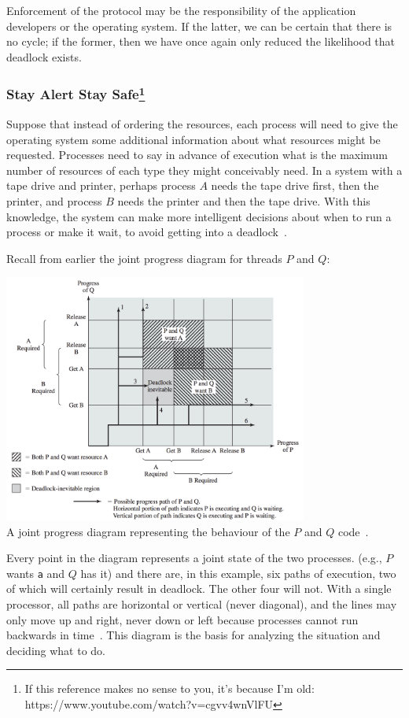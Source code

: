 Enforcement of the protocol may be the responsibility of the application developers or the operating system. If the latter, we can be certain that there is no cycle; if the former, then we have once again only reduced the likelihood that deadlock exists. 

\subsubsection*{Stay Alert Stay Safe\footnote{If this reference makes no sense to you, it's because I'm old: https://www.youtube.com/watch?v=cgvv4wnVlFU}}

Suppose that instead of ordering the resources, each process will need to give the operating system some additional information about what resources might be requested. Processes need to say in advance of execution what is the maximum number of resources of each type they might conceivably need. In a system with a tape drive and printer, perhaps process $A$ needs the tape drive first, then the printer, and process $B$ needs the printer and then the tape drive. With this knowledge, the system can make more intelligent decisions about when to run a process or make it wait, to avoid getting into a deadlock~\cite{osc}.

Recall from earlier the joint progress diagram for threads $P$ and $Q$:

\begin{center}
\includegraphics[width=0.75\textwidth]{images/joint-progress}\\
A joint progress diagram representing the behaviour of the $P$ and $Q$ code~\cite{osi}.
\end{center}

Every point in the diagram represents a joint state of the two processes. (e.g., $P$ wants \texttt{a} and $Q$ has it) and there are, in this example, six paths of execution, two of which will certainly result in deadlock. The other four will not.  With a single processor, all paths are horizontal or vertical (never diagonal), and the lines may only move up and right, never down or left because processes cannot run backwards in time~\cite{mos}. This diagram is the basis for analyzing the situation and deciding what to do.

